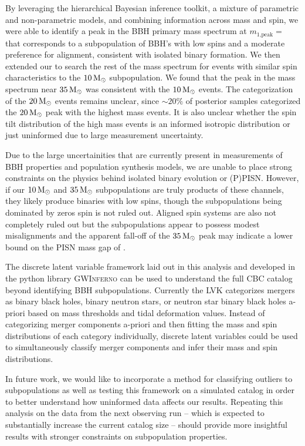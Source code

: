 By leveraging the hierarchical Bayesian inference toolkit, a mixture of parametric and non-parametric models, and combining information across mass and spin, we were able to identify a peak in the BBH primary mass spectrum at $m_\text{1,peak} = $ \result{$\CIPlusMinus{\macros[Mass][Base][PeakA][max]}$ \msun} that corresponds to a subpopulation of BBH's with low spins and a moderate preference for alignment, consistent with isolated binary formation. We then extended our \base{} to search the rest of the mass spectrum for events with similar spin characteristics to the $10{\,\rm M}_\odot$ subpopulation. We found that the peak in the mass spectrum near $35{\,\rm M}_\odot$ was consistent with the $10{\,\rm M}_\odot$ events. The categorization of the $20{\,\rm M}_\odot$ events remains unclear, since $\sim20\%$ of posterior samples categorized the $20{\,\rm M}_\odot$ peak with the highest mass events. It is also unclear whether the spin tilt distribution of the high mass events is an informed isotropic distribution or just uninformed due to large measurement uncertainty. 

Due to the large uncertainities that are currently present in measurements of BBH properties and population synthesis models, we are unable to place strong constraints on the physics behind isolated binary evolution or (P)PISN. However, if our $10{\,\rm M}_\odot$ and $35{\,\rm M}_\odot$ subpopulations are truly products of these channels, they likely produce binaries with low spins, though the subpopulations being dominated by zeros spin is not ruled out. Aligned spin systems are also not completely ruled out but the subpopulations appear to possess modest misalignments and the apparent fall-off of the $35{\,\rm M}_\odot$ peak may indicate a lower bound on the PISN mass gap of \result{$\CIPlusMinus{\macros[Mass][Composite][ContinuumA][99percentile]}$ \msun}.

The discrete latent variable framework laid out in this analysis and developed in the python library \textsc{GWInferno} can be used to understand the full CBC catalog beyond identifying BBH subpopulations. Currently the LVK categorizes mergers as binary black holes, binary neutron stars, or neutron star binary black holes a-priori based on mass thresholds and tidal deformation values. Instead of categorizing merger components a-priori and then fitting the mass and spin distributions of each category individually, discrete latent variables could be used to simultaneously classify merger components and infer their mass and spin distributions.

In future work, we would like to incorporate a method for classifying outliers to subpopulations as well as testing this framework on a simulated catalog in order to better understand how uninformed data affects our results. Repeating this analysis on the data from the next observing run -- which is expected to substantially increase the current catalog size -- should provide more insightful results with stronger constraints on subpopulation properties. 